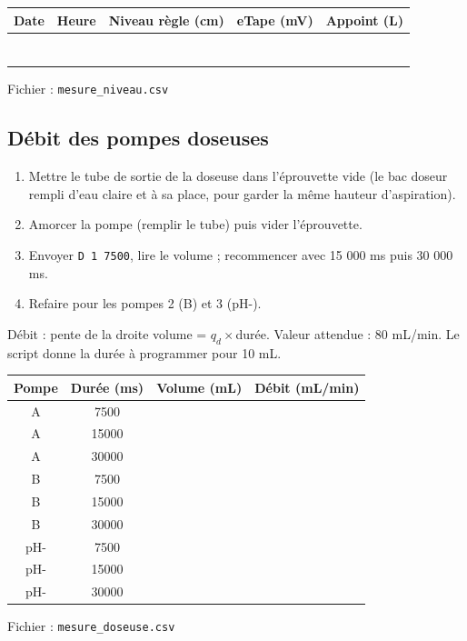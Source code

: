 \documentclass[11pt,a4paper]{article}
\begin{document}
\begin{center}
\begin{tabular}{|c|c|c|c|c|}
\hline
Date & Heure & Niveau règle (cm) & eTape (mV) & Appoint (L) \\ \hline
& & & & \\ \hline & & & & \\ \hline & & & & \\ \hline & & & & \\ \hline & & & & \\ \hline & & & & \\ \hline & & & & \\ \hline
\end{tabular}

Fichier : \texttt{mesure\_niveau.csv}
\end{center}

\subsection{Débit des pompes doseuses}
\begin{enumerate}
  \item Mettre le tube de sortie de la doseuse dans l'éprouvette vide (le bac doseur rempli d'eau claire et à sa place, pour garder la même hauteur d'aspiration).
  \item Amorcer la pompe (remplir le tube) puis vider l'éprouvette.
  \item Envoyer \texttt{D 1 7500}, lire le volume ; recommencer avec 15 000 ms puis 30 000 ms.
  \item Refaire pour les pompes 2 (B) et 3 (pH-).
\end{enumerate}
Débit : pente de la droite volume = $q_d\times$durée. Valeur attendue : 80 mL/min. Le script donne la durée à programmer pour 10 mL.

\begin{center}
\begin{tabular}{|c|c|c|c|}
\hline
Pompe & Durée (ms) & Volume (mL) & Débit (mL/min) \\ \hline
A & 7500 & & \\ \hline A & 15000 & & \\ \hline A & 30000 & & \\ \hline
B & 7500 & & \\ \hline B & 15000 & & \\ \hline B & 30000 & & \\ \hline
pH- & 7500 & & \\ \hline pH- & 15000 & & \\ \hline pH- & 30000 & & \\ \hline
\end{tabular}
\qquad Fichier : \texttt{mesure\_doseuse.csv}
\end{center}
\end{document}
